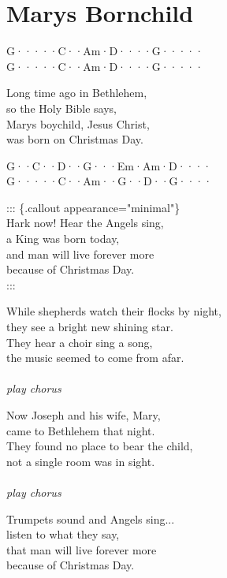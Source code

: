 \documentclass[
  letterpaper,
  a5paper]{memoir}
\begin{document}
\hypertarget{marys-bornchild}{%
\chapter{Marys Bornchild}\label{marys-bornchild}}

G·····\textbar C··Am·\textbar D····\textbar G·····\textbar{}\\
G·····\textbar C··Am·\textbar D····\textbar G·····\textbar{}

Long time ago in Bethlehem,\\
so the Holy Bible says,~~\\
Mary\textquotesingle s boychild, Jesus Christ,\\
was born on Christmas Day.

G··C··\textbar D··G···\textbar Em·Am·\textbar D····\textbar{}\\
G·····\textbar C··Am··\textbar G··D··\textbar G····\textbar{}

::: \{.callout appearance="minimal"\}\\
Hark now! Hear the Angels sing,\\
a King was born today,\\
and man will live forever more\\
because of Christmas Day.\\
:::~~

While shepherds watch their flocks by night,\\
they see a bright new shining star.\\
They hear a choir sing a song,~~\\
the music seemed to come from afar.~~\\
\hspace*{0.333em}\hspace*{0.333em}\\
\emph{play chorus}

Now Joseph and his wife, Mary,\\
came to Bethlehem that night.\\
They found no place to bear the child,~~\\
not a single room was in sight.~~~~~~\\
\hspace*{0.333em}\hspace*{0.333em}\\
\emph{play chorus}

Trumpets sound and Angels sing...\\
listen to what they say,\\
that man will live forever more\\
because of Christmas Day.
\end{document}
